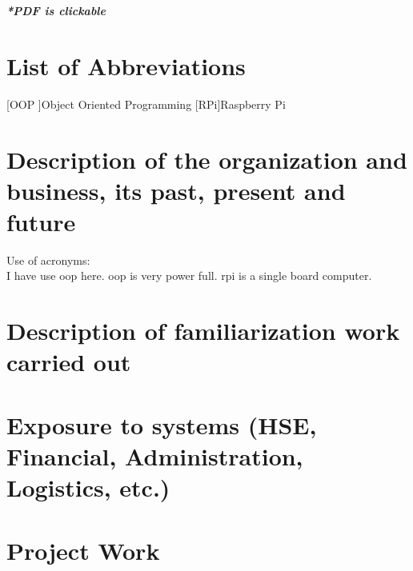 \documentclass[a4paper,12pt]{report}%
\begin{document}
\tableofcontents %
\vfill
\begin{center}
	\textbf{\textit{*PDF is clickable}}
\end{center}

\chapter*{List of Abbreviations}
\begin{acronym}
	[OOP ]{Object Oriented Programming }
	[RPi]{Raspberry Pi}
\end{acronym}

\listoffigures %
\listoftables %




\pagebreak

\chapter{Description of the organization and business, its past, present and	future}
Use of acronyms:\\

I have use \ac{oop} here. \ac{oop} is very power full. \Ac{rpi} is a single board computer.



\chapter{Description of familiarization work carried out}

\chapter{Exposure to systems (HSE, Financial, Administration, Logistics, etc.)}

\chapter{Project Work}
\end{document}

